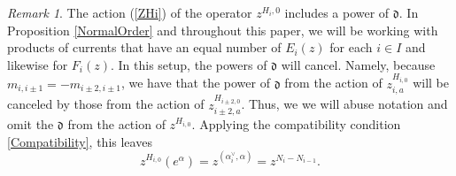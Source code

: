 \documentclass{amsart}
\newcommand{\ddd}{\mathfrak{d}}
\theoremstyle{remark}
\newtheorem{rem}[thm]{Remark}
\numberwithin{thm}{section}
\numberwithin{equation}{section}
\begin{document}
\begin{rem}
    The action (\ref{ZHi}) of the operator $z^{H_i,0}$ includes a power of $\ddd$.
    In Proposition \ref{NormalOrder} and throughout this paper, we will be working with products of currents that have an equal number of $E_i(z)$ for each $i\in I$ and likewise for $F_i(z)$.
    In this setup, the powers of $\ddd$ will cancel.
    Namely, because $m_{i,i\pm 1}=-m_{i\pm 2,i\pm 1}$, we have that the power of $\ddd$ from the action of $z_{i,a}^{H_{i,0}}$ will be canceled by those from the action of $z_{i\pm 2,a}^{H_{i\pm 2,0}}$.
    Thus, we we will abuse notation and omit the $\ddd$ from the action of $z^{H_{i,0}}$.
    Applying the compatibility condition \eqref{Compatibility}, this leaves
    \[
    z^{H_{i,0}}(e^\alpha)=z^{( \alpha_i^\vee,\alpha)}=z^{N_{i}-N_{i-1}}.
    \]
    \end{rem}
\end{document}
